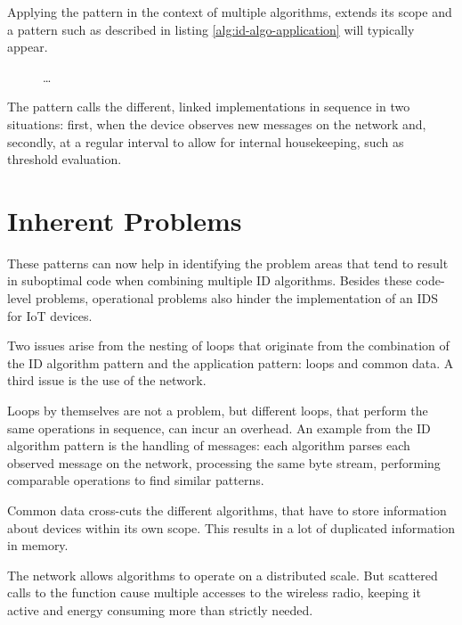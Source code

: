 \documentclass[conference]{IEEEtran}
\begin{document}
Applying the pattern in the context of multiple algorithms, extends its scope
and a pattern such as described in listing \ref{alg:id-algo-application} will
typically appear.

\begin{figure}[ht]
\begin{algorithmic}[1]
   
    \State {}
  \EndFor
  \State \dots
    \State {}
  \EndFor
\end{algorithmic}
\end{figure}

The pattern calls the different, linked implementations in sequence in two
situations: first, when the device observes new messages on the network and,
secondly, at a regular interval to allow for internal housekeeping, such as
threshold evaluation.

\section{Inherent Problems}
\label{problems}

These patterns can now help in identifying the problem areas that tend to
result in suboptimal code when combining multiple ID algorithms. Besides these
code-level problems, operational problems also hinder the implementation of an
IDS for IoT devices.

Two issues arise from the nesting of loops that originate from the combination
of the ID algorithm pattern and the application pattern: loops and common data.
A third issue is the use of the network.

\begin{LaTeXdescription}

  \item[Loops] by themselves are not a problem, but different loops, that
  perform the same operations in sequence, can incur an overhead. An example
  from the ID algorithm pattern is the handling of messages: each algorithm
  parses each observed message on the network, processing the same byte stream,
  performing comparable operations to find similar patterns.

  \item[Common data] cross-cuts the different algorithms, that have to store
  information about devices within its own scope. This results in a lot of
  duplicated information in memory.

  \item[The network] allows algorithms to operate on a distributed scale. But
  scattered calls to the  function cause multiple accesses to the
  wireless radio, keeping it active and energy consuming more than strictly
  needed.

\end{LaTeXdescription}
\end{document}
